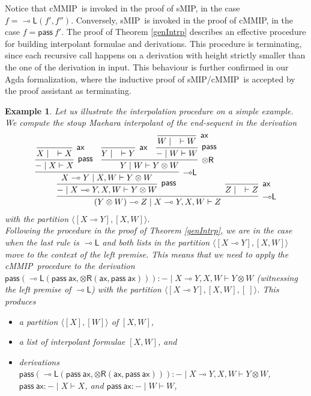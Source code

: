 \documentclass[sn-mathphys-num]{sn-jnl}%
\newcommand{\vd}{\vdash}
\newcommand{\tr}{\otimes\mathsf{R}}
\newcommand{\pass}{\mathsf{pass}}
\newcommand{\ax}{\mathsf{ax}}
\newcommand{\ot}{\otimes}
\newcommand{\lolli}{\multimap}
\newcommand{\lleft}{{\lolli}\mathsf{L}}
\newcommand{\sMIP}{\textsf{sMIP}}
\newcommand{\cMMIP}{\textsf{cMMIP}}
\theoremstyle{thmstyleone}%
\theoremstyle{thmstyletwo}%
\newtheorem{example}[theorem]{Example}%
\theoremstyle{thmstylethree}%
\begin{document}
Notice that \cMMIP~is invoked in the proof of \sMIP, in the case $f = \lleft(f',f'')$.
Conversely,  \sMIP~is invoked in the proof of \cMMIP, in the case $f = \pass \ f'$.
The proof of Theorem \ref{genIntrp} describes an effective procedure for building interpolant formulae and derivations.
This procedure is terminating, since each recursive call happens on a derivation with height strictly smaller than the one of the derivation in input.
This behaviour is further confirmed in our Agda formalization, where the inductive proof of \sMIP/\cMMIP~is accepted by the proof assistant as terminating.

\begin{example}
  Let us illustrate the interpolation procedure on a simple example.
  We compute the stoup Maehara interpolant of the end-sequent in the derivation 
  \begin{equation}\label{example:interpolant}
    \begin{array}{c}
      \infer[\lleft]{(Y \ot W) \lolli Z \mid X \lolli Y , X, W \vd Z}{
      \infer[\pass]{{-} \mid X \lolli Y , X , W\vd Y \ot W}{
      \infer[\lleft]{X \lolli Y \mid X , W \vd Y \ot W}{
      \infer[\pass]{{-} \mid X \vd X}{
      \infer[\ax]{X \mid \quad \vd X}{}
      }
      &
      \infer[\tr]{Y \mid W \vd Y \ot W}{
      \infer[\ax]{Y \mid \quad \vd Y}{}
      &
      \infer[\pass]{{-} \mid W \vd W}{
      \infer[\ax]{W \mid \quad \vd W}{}
      }
      }
      }
      }
      &
      \infer[\ax]{Z \mid \quad \vd Z}{}
      }
    \end{array}
  \end{equation}
  with the partition $\langle [X \lolli Y] , [X, W]\rangle$.
  \\
  Following the procedure in the proof of Theorem \ref{genIntrp}, we are in the case when the last rule is $\lleft$ and both lists in the partition $\langle [X \lolli Y] , [X, W]\rangle$ move to the context of the left premise.
  This means that we need to apply the \cMMIP~procedure to the derivation $\pass (\lleft (\pass \ \ax, \tr (\ax , \pass \ \ax))) : {-} \mid X \lolli Y , X, W \vd Y \ot W$ (witnessing the left premise of $\lleft$) with the partition $\langle [X \lolli Y] , [X, W] , [\ ] \rangle$.
  This produces
  \begin{itemize}
    \item[--] a partition $\langle [X] , [W] \rangle$ of $[X, W]$,
    \item[--] a list of interpolant formulae $[X , W]$, and
    \item[--] derivations $\pass (\lleft (\pass \ \ax, \tr (\ax , \pass \ \ax))) : {-} \mid X \lolli Y , X, W \vd Y \ot W$, $\pass \ \ax : {-} \mid X \vd X$, and $\pass \ \ax : {-} \mid W \vd W$,

\end{itemize}
\end{example}
\end{document}
